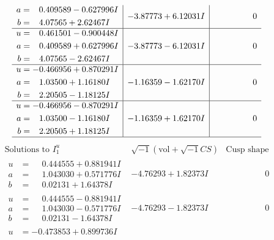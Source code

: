 \documentclass[1p]{elsarticle_modified}
\theoremstyle{definition}
\newcommand{\I}{\sqrt{-1}}
\begin{document}
$$\begin{array}{c|c|c}
\begin{aligned}
a &= \phantom{-}0.409589 - 0.627996 I \\
b &= \phantom{-}4.07565 + 2.62467 I\end{aligned}
 & -3.87773 + 6.12031 I & \phantom{-0.000000 } 0 \\ \hline\begin{aligned}
u &= \phantom{-}0.461501 - 0.900448 I \\
a &= \phantom{-}0.409589 + 0.627996 I \\
b &= \phantom{-}4.07565 - 2.62467 I\end{aligned}
 & -3.87773 - 6.12031 I & \phantom{-0.000000 } 0 \\ \hline\begin{aligned}
u &= -0.466956 + 0.870291 I \\
a &= \phantom{-}1.03500 + 1.16180 I \\
b &= \phantom{-}2.20505 - 1.18125 I\end{aligned}
 & -1.16359 - 1.62170 I & \phantom{-0.000000 } 0 \\ \hline\begin{aligned}
u &= -0.466956 - 0.870291 I \\
a &= \phantom{-}1.03500 - 1.16180 I \\
b &= \phantom{-}2.20505 + 1.18125 I\end{aligned}
 & -1.16359 + 1.62170 I & \phantom{-0.000000 } 0\\
 \hline 
 \end{array}$$\newpage$$\begin{array}{c|c|c}  
\text{Solutions to }I^u_{1}& \I (\text{vol} + \sqrt{-1}CS) & \text{Cusp shape}\\
 \hline 
\begin{aligned}
u &= \phantom{-}0.444555 + 0.881941 I \\
a &= \phantom{-}1.043030 + 0.571776 I \\
b &= \phantom{-}0.02131 + 1.64378 I\end{aligned}
 & -4.76293 + 1.82373 I & \phantom{-0.000000 } 0 \\ \hline\begin{aligned}
u &= \phantom{-}0.444555 - 0.881941 I \\
a &= \phantom{-}1.043030 - 0.571776 I \\
b &= \phantom{-}0.02131 - 1.64378 I\end{aligned}
 & -4.76293 - 1.82373 I & \phantom{-0.000000 } 0 \\ \hline\begin{aligned}
u &= -0.473853 + 0.899736 I \\

\end{aligned}
\end{array}$$
\end{document}
